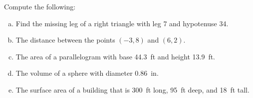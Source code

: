 \documentclass[11pt,letterpaper]{article}
\begin{document}

 Compute the following:
	\begin{enumerate}[(a)]
	\item Find the missing leg of a right triangle with leg 7 and hypotenuse 34.
	\item The distance between the points $(-3, 8)$ and $(6,2)$. 
	\item The area of a parallelogram with base 44.3~ft and height 13.9~ft. 
	\item The volume of a sphere with diameter 0.86~in.
	\item The surface area of a building that is 300~ft long, 95~ft deep, and 18~ft tall. 
	\end{enumerate} 
\end{document}

